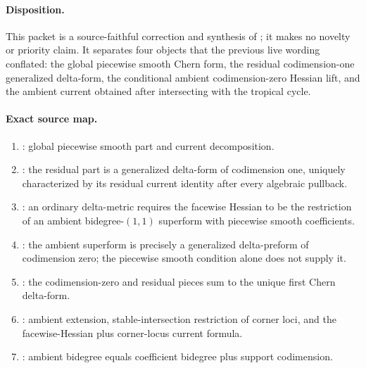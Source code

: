
\paragraph{Disposition.}
This packet is a source-faithful correction and synthesis of
\cite[\S\S9.7--9.13]{GK17}; it makes no novelty or priority claim.  It
separates four objects that the previous live wording conflated: the global
piecewise smooth Chern form, the residual codimension-one generalized
delta-form, the conditional ambient codimension-zero Hessian lift, and the
ambient current obtained after intersecting with the tropical cycle.

\paragraph{Exact source map.}
\begin{enumerate}
\item \cite[\S9.7, especially (9.7.1)]{GK17}: global piecewise smooth part
 and current decomposition.
\item \cite[Proposition~9.8]{GK17}: the residual part is a generalized
 delta-form of codimension one, uniquely characterized by its residual
 current identity after every algebraic pullback.
\item \cite[Definition~9.9]{GK17}: an ordinary delta-metric requires the
 facewise Hessian to be the restriction of an ambient bidegree-\((1,1)\)
 superform with piecewise smooth coefficients.
\item \cite[Remark~9.10]{GK17}: the ambient superform is precisely a
 generalized delta-preform of codimension zero; the piecewise smooth
 condition alone does not supply it.
\item \cite[Proposition~9.11, Definition~9.12, and \S9.13]{GK17}: the
 codimension-zero and residual pieces sum to the unique first Chern
 delta-form.
\item \cite[Proposition~1.8, Proposition~1.14, Corollary~1.15, and
 Corollary~3.19]{GK17}: ambient extension, stable-intersection restriction
 of corner loci, and the facewise-Hessian plus corner-locus current formula.
\item \cite[Definition~2.9 and Example~2.10]{GK17}: ambient bidegree equals
 coefficient bidegree plus support codimension.
\end{enumerate}

